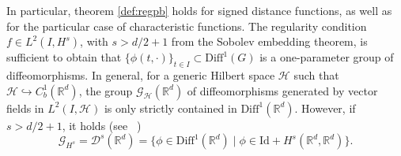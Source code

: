 In particular, theorem \ref{def:regpb} holds for signed distance functions, as well as for the particular case of characteristic functions. %
The regularity condition $f\in L^2(I, H^s)$, with $s>d/2 + 1$ from the Sobolev embedding theorem, is sufficient to obtain that $\{\phi(t, \cdot)\}_{t\in I}\subset\text{Diff}^1(G)$ is a one-parameter group of diffeomorphisms. 
%
In general,  for a generic Hilbert space $\mathcal{H}$ such that $\mathcal{H}\hookrightarrow C^1_b(\mathbb{R}^d)$, the group $\mathcal{G}_\mathcal{H}(\mathbb{R}^d)$ of diffeomorphisms generated by vector fields in $L^2(I, \mathcal{H})$ is only strictly contained in $\text{Diff}^1(\mathbb{R}^d)$.
However, if $s>d/2+1$, it holds (see ~\cite{bruveris2017completeness}) 
\[
\mathcal{G}_{H^s}=\mathcal{D}^s(\mathbb{R}^d) =\{\phi\in\text{Diff}^1(\mathbb{R}^d) \mid \phi\in\text{Id}+H^s(\mathbb{R}^d,\mathbb{R}^d)\}.
\]



